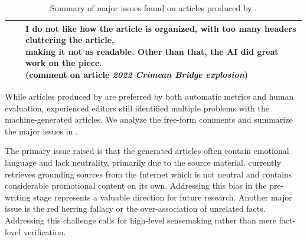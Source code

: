 \begin{table}
{\begin{tabular}{ccl}
\cmidrule{3-3}
                                                             &                     & \makecell[l]{I do not like how the article is organized, with too many headers cluttering the article,\\ making it not as readable. Other than that, the AI did great work on the piece. \\(comment on article \textit{2022 Crimean Bridge explosion})}                                                                                                                       \\
\bottomrule
\end{tabular}
}
\caption{Summary of major issues found on articles produced by \system.}
\label{table:comment_summary}
\end{table}


While articles produced by \system are preferred by both automatic metrics and human evaluation, experienced editors still identified multiple problems with the machine-generated articles. We analyze the free-form comments and summarize the major issues in .

The primary issue raised is that the generated articles often contain emotional language and lack neutrality, primarily due to the source material. \system currently retrieves grounding sources from the Internet which is not neutral and contains considerable promotional content on its own. Addressing this bias in the pre-writing stage represents a valuable direction for future research. Another major issue is the red herring fallacy or the over-association of unrelated facts. Addressing this challenge calls for high-level sensemaking rather than mere fact-level verification.






